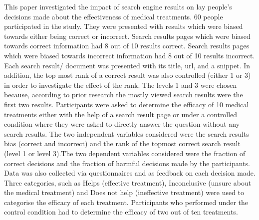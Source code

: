 \documentclass[]{article}
\begin{document}
This paper investigated the impact of search engine results on lay people's decisions made about the effectiveness of medical treatments. 60 people participated in the study. They were presented with results which were biased towards either being correct or incorrect. Search results pages which were biased towards correct information had 8 out of 10 results correct. Search results pages which were biased towards incorrect information had 8 out of 10 results incorrect. Each search result/ document was presented with its title, url, and a snippet. In addition, the top most rank of a correct result was also controlled (either 1 or 3) in order to investigate the effect of the rank. The levels 1 and 3 were chosen because, according to prior research the mostly viewed search results were the first two results. Participants were asked to determine the efficacy of 10 medical treatments either with the help of a search result page or under a controlled condition where they were asked to directly answer the question without any search results. The two independent variables considered were the search results bias (correct and incorrect) and the rank of the topmost correct search result (level 1 or level 3).The two dependent variables considered were the fraction of correct decisions and the fraction of harmful decisions made by the participants. Data was also collected via questionnaires and as feedback on each decision made. Three categories, such as Helps (effective treatment), Inconclusive (unsure about the medical treatment) and Does not help (ineffective treatment) were used to categorise the efficacy of each treatment. Participants who performed under the control condition had to determine the efficacy of two out of ten treatments. 
\end{document}
